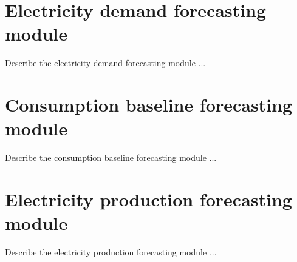 \section{Electricity demand forecasting module}
\label{sec:demandmodel}
\vspace{0.2 cm}

Describe the electricity demand forecasting module ...


\section{Consumption baseline forecasting module}
\label{sec:baselinemodel}
\vspace{0.2 cm}

Describe the consumption baseline forecasting module ...


\section{Electricity production forecasting module}
\label{sec:productionmodel}
\vspace{0.2 cm}

Describe the electricity production forecasting module ...
